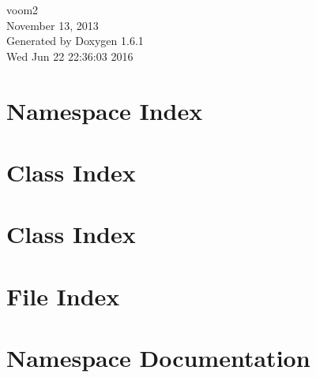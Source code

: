 \documentclass[a4paper]{book}
\begin{document}
\hypersetup{pageanchor=false}
\begin{titlepage}
\vspace*{7cm}
\begin{center}
{\Large voom2 \\[1ex]\large November 13, 2013 }\\
\vspace*{1cm}
{\large Generated by Doxygen 1.6.1}\\
\vspace*{0.5cm}
{\small Wed Jun 22 22:36:03 2016}\\
\end{center}
\end{titlepage}
\clearemptydoublepage
{}
\tableofcontents
\clearemptydoublepage
{}
\hypersetup{pageanchor=true}
\chapter{Namespace Index}

\chapter{Class Index}

\chapter{Class Index}

\chapter{File Index}

\chapter{Namespace Documentation}

\end{document}
